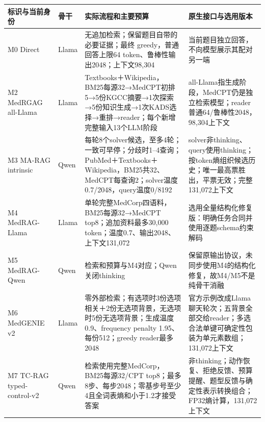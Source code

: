 \documentclass[
  11pt,
  a4paper,
]{article}
\newcounter{none} %
\begin{document}
{\def\LTcaptype{none} %
\begin{longtable}[]{@{}
  >{\raggedright\arraybackslash}p{}
  >{\raggedright\arraybackslash}p{}
  >{\raggedright\arraybackslash}p{}
  >{\raggedright\arraybackslash}p{}@{}}
\toprule\noalign{}
\begin{minipage}[b]{\linewidth}\raggedright
标识与当前身份
\end{minipage} & \begin{minipage}[b]{\linewidth}\raggedright
骨干
\end{minipage} & \begin{minipage}[b]{\linewidth}\raggedright
实际流程和主要预算
\end{minipage} & \begin{minipage}[b]{\linewidth}\raggedright
原生接口与选用版本
\end{minipage} \\
\midrule\noalign{}
\endhead
\bottomrule\noalign{}
\endlastfoot
M0 Direct & Llama & 无追加检索；保留题目自带的必要证据；最终
greedy，普通回答上限64 token、鲁棒性输出2048；上下文98,304 &
当前题目独立回答，不向模型展示其配对另一端 \\
M2 MedRGAG all-Llama & Llama &
Textbooks＋Wikipedia，BM25每源32→MedCPT初排5→5份KGCC摘要→1次探索→5份知识生成→1次KADS选择→重排→reader；每个新增完整输入13个LLM阶段
&
all-Llama指生成阶段，MedCPT仍是独立检索模型；reader普通64/鲁棒性2048，98,304上下文 \\
M3 MA-RAG intrinsic & Qwen &
每轮8个solver候选，至多4轮；一致可早停；分歧时1--4查询；PubMed＋Textbooks＋Wikipedia，BM25共32、MedCPT每查询2；solver温度0.7/2048，query温度0/8192
&
solver非thinking、query使用thinking；按token熵组织候选历史；唯一最高票胜出，平票无效；完整131,072上下文 \\
M4 MedRAG-Llama & Llama & 单轮完整MedCorp四语料，BM25每源32→MedCPT
top8；追加资料最多30,000 token；温度0.7、输出2048、上下文131,072 &
选用全量结构化修复版：明确任务合同并使用逐题schema约束解码 \\
M5 MedRAG-Qwen & Qwen & 检索和预算与M4对应；Qwen关闭thinking &
保留原输出协议，未同步使用M4的结构化修复，故M4/M5不是纯骨干消融 \\
M6 MedGENIE v2 & Llama &
零外部检索；有选项时3份选项相关＋2份无选项背景，无选项时5份无选项背景；生成温度0.9、frequency
penalty 1.95、每份512；greedy reader最多2048 &
官方示例改成Llama聊天轮次；五背景全部交给reader；多选合法单键可确定性包装为单元素数组；131,072上下文 \\
M7 TC-RAG typed-control-v2 & Qwen & 检索使用完整MedCorp，BM25每源32/CPT
top8；最多8步、每步2048；零基步号至少4且全词表熵和小于1.2才接受答案 &
非thinking；动作恢复、拒绝反馈、预算提醒、题型反馈与确定性表示转换组合；FP32熵计算，131,072上下文 \\
\end{longtable}
}
\end{document}
